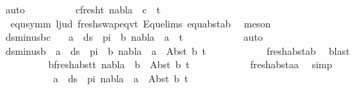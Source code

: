 \begin{isabellebody}
\ auto\isanewline
\ \ \ \ \ \ \ \ \isamarkupfalse%
\ c{\isacharunderscore}{\kern0pt}fresh{\isacharunderscore}{\kern0pt}t{}{\isacharcolon}{\kern0pt}\ {\isachardoublequoteopen}nabla\ {\isasymturnstile}\ c\ {\isasymsharp}\ t{}{\isachardoublequoteclose}\isanewline
\ \ \ \ \ \ \ \ \ \ \isamarkupfalse%
\ {}\ equ{\isacharunderscore}{\kern0pt}symm\ l{}{\isacharunderscore}{\kern0pt}jud\ fresh{\isacharunderscore}{\kern0pt}swap{\isacharunderscore}{\kern0pt}eqvt\ Equ{\isacharunderscore}{\kern0pt}elims\ equ{\isacharunderscore}{\kern0pt}abst{\isacharunderscore}{\kern0pt}ab\ \isamarkupfalse%
\ meson\isanewline
\ \ \ \ \ \ \ \ \isamarkupfalse%
\ ds{\isacharunderscore}{\kern0pt}minus{\isacharunderscore}{\kern0pt}bc\ \isamarkupfalse%
\ {\isachardoublequoteopen}{\isasymforall}\ a\ {\isasymin}\ ds\ {\isacharbrackleft}{\kern0pt}{\isacharbrackright}{\kern0pt}\ pi\ {\isacharminus}{\kern0pt}\ {\isacharbraceleft}{\kern0pt}b{\isacharbraceright}{\kern0pt}{\isachardot}{\kern0pt}\ nabla\ {\isasymturnstile}\ a\ {\isasymsharp}\ t{}{\isachardoublequoteclose}\isanewline
\ \ \ \ \ \ \ \ \ \ \isamarkupfalse%
\ auto\isanewline
\ \ \ \ \ \ \ \ \isamarkupfalse%
\ \isamarkupfalse%
\ ds{\isacharunderscore}{\kern0pt}minus{\isacharunderscore}{\kern0pt}b{\isacharcolon}{\kern0pt}\ {\isachardoublequoteopen}{\isasymforall}\ a\ {\isasymin}\ ds\ {\isacharbrackleft}{\kern0pt}{\isacharbrackright}{\kern0pt}\ pi\ {\isacharminus}{\kern0pt}\ {\isacharbraceleft}{\kern0pt}b{\isacharbraceright}{\kern0pt}{\isachardot}{\kern0pt}\ nabla\ {\isasymturnstile}\ a\ {\isasymsharp}\ Abst\ b\ t{}{\isachardoublequoteclose}\isanewline
\ \ \ \ \ \ \ \ \ \ \isamarkupfalse%
\ fresh{\isacharunderscore}{\kern0pt}abst{\isacharunderscore}{\kern0pt}ab\ \isamarkupfalse%
\ blast\isanewline
\ \ \ \ \ \ \ \ \isamarkupfalse%
\ b{\isacharunderscore}{\kern0pt}fresh{\isacharunderscore}{\kern0pt}abst{\isacharunderscore}{\kern0pt}t{}{\isacharcolon}{\kern0pt}\ {\isachardoublequoteopen}nabla\ {\isasymturnstile}\ b\ {\isasymsharp}\ Abst\ b\ t{}{\isachardoublequoteclose}\isanewline
\ \ \ \ \ \ \ \ \ \ \isamarkupfalse%
\ fresh{\isacharunderscore}{\kern0pt}abst{\isacharunderscore}{\kern0pt}aa\ \isamarkupfalse%
\ simp\isanewline
\ \ \ \ \ \ \ \ \isamarkupfalse%
\ {\isachardoublequoteopen}{\isasymforall}\ a\ {\isasymin}\ ds\ {\isacharbrackleft}{\kern0pt}{\isacharbrackright}{\kern0pt}\ pi{\isachardot}{\kern0pt}\ nabla\ {\isasymturnstile}\ a\ {\isasymsharp}\ Abst\ b\ t{}{\isachardoublequoteclose}\isanewline

\end{isabellebody}
